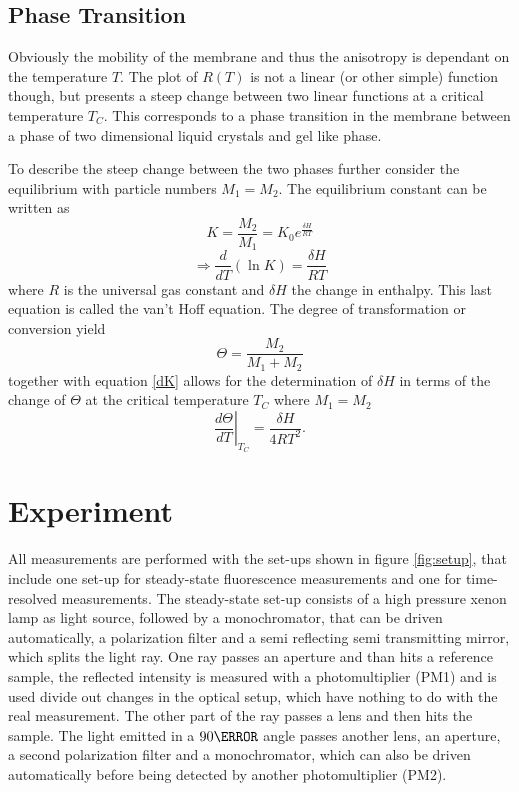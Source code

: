 \documentclass{scrartcl}
\numberwithin{equation}{section}
\numberwithin{figure}{section}
\numberwithin{table}{section}
\newcommand{\eq}[2]{\begin{equation}#1\label{#2}\end{equation}}
\begin{document}
\subsection{Phase Transition}
Obviously the mobility of the membrane and thus the anisotropy is dependant on the temperature $T$. The plot of $R(T)$ is not a linear (or other simple) function though, but presents a steep change between two linear functions at a critical temperature $T_C$. This corresponds to a phase transition in the membrane between a phase of two dimensional liquid crystals and gel like phase.

To describe the steep change between the two phases further consider the equilibrium with particle numbers $M_1=M_2$. The equilibrium constant can be written as
\eq{K = \frac{M_2}{M_1} = K_0 e^{\frac{\delta H}{R T}}}{K}
\eq{\Rightarrow \frac{d}{dT}(\ln K) = \frac{\delta H}{R T}}{dK}
where $R$ is the universal gas constant and $\delta H$ the change in enthalpy. This last equation is called the van't Hoff equation. The degree of transformation or conversion yield 
\eq{\Theta = \frac{M_2}{M_1+M_2}}{Theta}
together with equation \ref{dK} allows for the determination of $\delta H$ in terms of the change of $\Theta$ at the critical temperature $T_C$ where $M_1=M_2$
\eq{{\left.\frac{d\Theta}{dT}\right |}_{T_C} = \frac{\delta H}{4 R T^2} .}{dTheta}

\clearpage

\section{Experiment}
All measurements are performed with the set-ups shown in figure \ref{fig:setup}, that include one set-up for steady-state fluorescence measurements and one for time-resolved measurements. The steady-state set-up consists of a high pressure xenon lamp as light source, followed by a monochromator, that can be driven automatically, a polarization filter and a semi reflecting semi transmitting mirror, which splits the light ray. One ray passes an aperture and than hits a reference sample, the reflected intensity is measured with a photomultiplier (PM1) and is used divide out changes in the optical setup, which have nothing to do with the real measurement. The other part of the ray passes a lens and then hits the sample. The light emitted in a $90 \degree$ angle passes another lens, an aperture, a second polarization filter and a monochromator, which can also be driven automatically before being detected by another photomultiplier (PM2).
\end{document}
